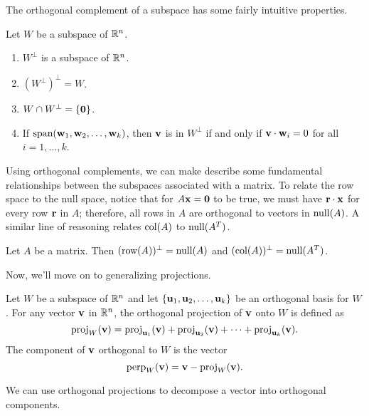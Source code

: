 \documentclass[../m073main.tex]{subfiles}
\begin{document}
The orthogonal complement of a subspace has some fairly intuitive properties.

\begin{theorem}
	Let $W$ be a subspace of $\mathbb{R}^n$.
	\begin{enumerate}[label=(\alph*)]
		\item $W^\perp$ is a subspace of $\mathbb{R}^n$.
		\item $\left( W^\perp \right)^\perp = W$.
		\item $W \cap W^\perp = \{\mathbf{0}\}$.
		\item If $\textrm{span}(\mathbf{w}_1, \mathbf{w}_2, \ldots, \mathbf{w}_k)$, then $\mathbf{v}$ is in $W^\perp$ if and only if $\mathbf{v} \cdot \mathbf{w}_i = 0$ for all $i = 1, \ldots, k$.
	\end{enumerate}
\end{theorem}

Using orthogonal complements, we can make describe some fundamental relationships between the subspaces associated with a matrix.
To relate the row space to the null space, notice that for $A \mathbf{x} = \mathbf{0}$ to be true, we must have $\mathbf{r} \cdot \mathbf{x}$ for every row $\mathbf{r}$ in $A$; therefore, all rows in $A$ are orthogonal to vectors in $\textrm{null}(A)$.
A similar line of reasoning relates $\textrm{col}(A)$ to $\textrm{null}(A^T)$. 

\begin{theorem}
	Let $A$ be a matrix.
	Then $(\textrm{row}(A))^\perp = \textrm{null}(A)$ and $(\textrm{col}(A))^\perp = \textrm{null}(A^T)$.
\end{theorem}

Now, we'll move on to generalizing projections.

\begin{definition}
	Let $W$ be a subspace of $\mathbb{R}^n$ and let $\{\mathbf{u}_1, \mathbf{u}_2, \ldots, \mathbf{u}_k\}$ be an orthogonal basis for $W$.
	For any vector $\mathbf{v}$ in $\mathbb{R}^n$, the orthogonal projection of $\mathbf{v}$ onto $W$ is defined as
	\[ \textrm{proj}_W(\mathbf{v}) = \textrm{proj}_{\mathbf{u}_1}(\mathbf{v}) + \textrm{proj}_{\mathbf{u}_2}(\mathbf{v}) + \cdots + \textrm{proj}_{\mathbf{u}_k}(\mathbf{v}). \]
	The component of $\mathbf{v}$ orthogonal to $W$ is the vector
	\[ \textrm{perp}_W(\mathbf{v}) = \mathbf{v} - \textrm{proj}_W(\mathbf{v}). \]
\end{definition}

We can use orthogonal projections to decompose a vector into orthogonal components.
\end{document}
